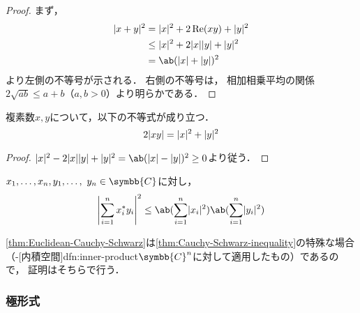 \documentclass[../sotsu.tex]{subfiles}
\begin{document}
\begin{proof}
    まず，
    \begin{equation*}
        \begin{split}
            \abs{x + y}^2
                &= \abs{x}^2 + 2\Real (xy) + \abs{y}^2    \\
                &\leq \abs{x}^2 + 2 \abs{x} \abs{y} + \abs{y}^2  \\
                &= \ab( \abs{x} + \abs{y} )^2
        \end{split}
    \end{equation*}
    より左側の不等号が示される．
    右側の不等号は，
    相加相乗平均の関係$2\sqrt{ab} \leq a + b$（$a, b > 0$）より明らかである．
\end{proof}


\begin{corollary}
    \label{thm:complex-abs-product-inequality}
    複素数$x, y$について，以下の不等式が成り立つ．
    \begin{equation}
        \label{eq:complex-abs-product-inequality}
        2\lvert xy\rvert = \lvert x\rvert^2 + \lvert y\rvert^2
    \end{equation}
\end{corollary}

\begin{proof}
    \(
        \abs{x}^2 -2 \abs{x} \abs{y} + \abs{y}^2
            = \ab( \abs{x} - \abs{y} )^2
            \geq 0
    \)より従う．
\end{proof}


\begin{theorem}
    \label{thm:Euclidean-Cauchy-Schwarz}
    $x_1, \dots, x_n, y_1, \dots, \  y_n \in \symbb{C}$に対し，
    \begin{equation}
        \label{eq:Euclidean-Cauchy-Schwarz}
        \abs*{ \sum_{i=1}^{n} \conj{x_i} y_i }^2
        \leq \ab( \sum_{i=1}^{n} \abs{x_i}^2 )
             \ab( \sum_{i=1}^{n} \abs{y_i}^2 )
    \end{equation}
\end{theorem}

\cref{thm:Euclidean-Cauchy-Schwarz}は\cref{thm:Cauchy-Schwarz-inequality}の特殊な場合%
（-[内積空間]{dfn:inner-product}$\symbb{C}^n$に対して適用したもの）であるので，
証明はそちらで行う．



\subsubsection*{極形式}
\end{document}
